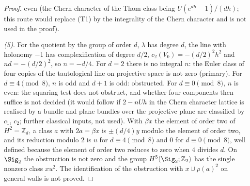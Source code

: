 \begin{proof}
even (the Chern character of the Thom class being $U(e^{dh} - 1)/(dh)$; this route would replace (T1) by the integrality of the Chern character and is not used in the proof).

\emph{(5).} For the quotient by the group of order $d$, $\lambda$ has degree $d$, the line with holonomy $-1$ has complexification of degree $d/2$, $c_{2}(V_{0}) = -(d/2)^{2}h^{2}$ and $n d = -(d/2)^{2}$, so $n = -d/4$. For $d = 2$ there is no integral $n$: the Euler class of four copies of the tautological line on projective space is not zero (primary). For $d \equiv 4 \pmod 8$, $n$ is odd and $d + 1$ is odd: obstructed. For $d \equiv 0 \pmod 8$, $n$ is even: the squaring test does not obstruct, and whether four components then suffice is not decided (it would follow if $2 - nUh$ in the Chern character lattice is realised by a bundle and plane bundles over the projective plane are classified by $c_{1}$, $c_{2}$; further classical inputs, not used). With $\beta x$ the element of order two of $H^{2} = \mathbb{Z}_{d}$, a class $a$ with $2a = \beta x$ is $\pm(d/4)y$ modulo the element of order two, and its reduction modulo $2$ is $u$ for $d \equiv 4 \pmod 8$ and $0$ for $d \equiv 0 \pmod 8$, well defined because the element of order two reduces to zero when $4$ divides $d$. On $\Sig_{2}$ the obstruction is not zero and the group $H^{5}(\Sig_{2}; \mathbb{Z}_{2})$ has the single nonzero class $xu^{2}$. The identification of the obstruction with $x \cup \rho(a)^{2}$ on general walls is not proved.
\end{proof}
